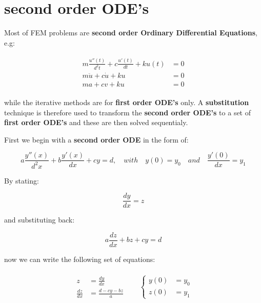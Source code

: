 \documentclass[10pt,b5paper,titlepage]{book}
\newenvironment{eqarray}
{
    \begin{eqnarray}
        \begin{aligned}
}
{
        \end{aligned}
    \end{eqnarray}
}
\begin{document}
\section{second order ODE's}

Most of FEM problems are \textbf{second order Ordinary Differential Equations}, e.g:

\begin{eqarray}
    m \frac{u''(t)}{d^2 t} + c \frac{u'(t)}{dt} + k u(t) &= 0\\
    m \ddot{u} + c \dot{u} + k u &= 0\\
    m a + c v + ku &= 0
\end{eqarray}

while the iterative methods are for \textbf{first order ODE's} only.
A \textbf{substitution} technique is therefore used to transform the
\textbf{second order ODE's} to a set of \textbf{first order ODE's} and these are
then solved sequentialy.

First we begin with a \textbf{second order ODE} in the form of:

\begin{equation}
    a \frac{y''(x)}{d^2 x} + b \frac{y'(x)}{dx} + c y = d, \quad with \quad y(0) = y_0 \quad and \quad
    \frac{y'(0)}{dx} = y_1
\end{equation}

By stating:

\begin{equation}
    \frac{dy}{dx} = z
\end{equation}

and substituting back:

\begin{equation}
    a \frac{dz}{dx} + b z + c y = d
\end{equation}

now we can write the following set of equations:

\begin{eqarray}
    \begin{aligned}
        z &= \frac{dy}{dx}\\
        \frac{dz}{dx} &= \frac{d - c y - b z}{a}
    \end{aligned} &
    \quad \left\{
    \begin{aligned}
        y(0) &= y_0\\
        z(0) &= y_1
    \end{aligned} \right.
\end{eqarray}
\end{document}

